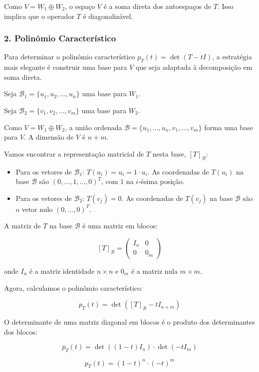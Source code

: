 Como $V=W_1 \oplus W_2$, o espaço $V$ é a soma direta dos autoespaços de $T$. Isso implica que o
operador $T$ é diagonalizável.

\subsubsection*{2. Polinômio Característico}

Para determinar o polinômio característico $p_T(t)=\det(T-tI)$, a estratégia mais elegante é
construir uma base para $V$ que seja adaptada à decomposição em soma direta.

Seja $\mathcal{B}_1=\{u_1,u_2,\ldots,u_n\}$ uma base para $W_1$.

Seja $\mathcal{B}_2=\{v_1,v_2,\ldots,v_m\}$ uma base para $W_2$.

Como $V=W_1 \oplus W_2$, a união ordenada $\mathcal{B}=\{u_1,\ldots,u_n,v_1,\ldots,v_m\}$ forma uma base para $V$.
A dimensão de $V$ é $n+m$.

Vamos encontrar a representação matricial de $T$ nesta base, $[T]_{\mathcal{B}}$:

\begin{itemize}
\item Para os vetores de $\mathcal{B}_1$: $T(u_i)=u_i=1\cdot u_i$. As coordenadas de $T(u_i)$ na base $\mathcal{B}$ são
$(0,\ldots,1,\ldots,0)^T$, com $1$ na $i$-ésima posição.
\item Para os vetores de $\mathcal{B}_2$: $T(v_j)=0$. As coordenadas de $T(v_j)$ na base $\mathcal{B}$ são o vetor nulo
$(0,\ldots,0)^T$.
\end{itemize}

A matriz de $T$ na base $\mathcal{B}$ é uma matriz em blocos:

\[
[T]_{\mathcal{B}} =
\begin{pmatrix}
I_n & 0 \\
0 & 0_m
\end{pmatrix}
\]

onde $I_n$ é a matriz identidade $n\times n$ e $0_m$ é a matriz nula $m\times m$.

Agora, calculamos o polinômio característico:

\[
p_T(t) = \det([T]_{\mathcal{B}} - tI_{n+m})
\]

O determinante de uma matriz diagonal em blocos é o produto dos determinantes dos blocos:

\[
p_T(t) = \det((1-t)I_n)\cdot \det(-tI_m)
\]

\[
p_T(t) = (1-t)^n \cdot (-t)^m
\]


